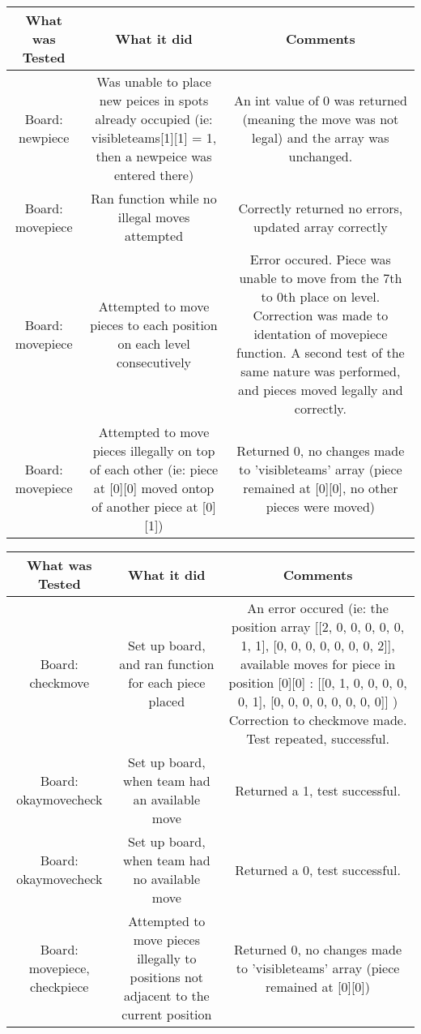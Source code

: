 \documentclass[12pt]{article}
\begin{document}
	\begin{tabularx}{\linewidth}{|C|C|C|}
		\hline 
		What was Tested & What it did & Comments \\
		\hline 
		      Board: newpiece & Was unable to place new peices in spots already occupied (ie: visibleteams[1][1] = 1, then a newpeice was entered there) & An int value of 0 was returned (meaning the move was not legal) and the array was unchanged. \\ 
		      \hline 
		      Board: movepiece & Ran function while no illegal moves attempted & Correctly returned no errors, updated array correctly \\
		      \hline 
		      Board: movepiece & Attempted to move pieces to each position on each level consecutively & Error occured. Piece was unable to move from the 7th to 0th place on level. Correction was made to identation of movepiece function. A second test of the same nature was performed, and pieces moved legally and correctly. \\
		      \hline 
		      Board: movepiece & Attempted to move pieces illegally on top of each other (ie: piece at [0][0] moved ontop of another piece at [0][1]) & Returned 0, no changes made to 'visibleteams' array (piece remained at [0][0], no other pieces were moved) \\
		      \hline 
\end{tabularx}
	\begin{tabularx}{\linewidth}{|C|C|C|}
		\hline 
		What was Tested & What it did & Comments \\
		\hline 
		      Board: checkmove & Set up board, and ran function for each piece placed & An error occured (ie: the position array [[2, 0, 0, 0, 0, 0, 1, 1], [0, 0, 0, 0, 0, 0, 0, 2]], available moves for piece in position [0][0] : [[0, 1, 0, 0, 0, 0, 0, 1], [0, 0, 0, 0, 0, 0, 0, 0]] ) Correction to checkmove made. Test repeated, successful. \\
		      \hline 
		      Board: okaymovecheck & Set up board, when team had an available move & Returned a 1, test successful. \\
		      \hline 
		      Board: okaymovecheck & Set up board, when team had no available move & Returned a 0, test successful. \\
		      \hline 
		      Board: movepiece, checkpiece & Attempted to move pieces illegally to positions not adjacent to the current position & Returned 0, no changes made to 'visibleteams' array (piece remained at [0][0]) \\   
		      \hline 
	\end{tabularx}
	
\end{document}
